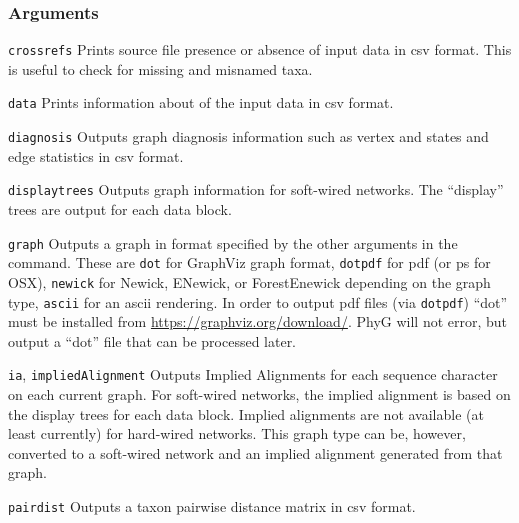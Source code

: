 \documentclass[11pt]{article}
\begin{document}
		\subsubsection{Arguments}
				\noindent \texttt{crossrefs} Prints source file presence or absence of input data in csv format.  This is useful to check for 
				missing and misnamed taxa.
			
				\smallskip
				\noindent \texttt{data} Prints information about of the input data in csv format.
				
				\smallskip
				\noindent \texttt{diagnosis}  Outputs graph diagnosis information such as vertex and states and edge statistics in csv format. 
			
				\smallskip
				\noindent \texttt{displaytrees}  Outputs graph information for soft-wired networks.  The ``display'' trees are output for each data block. 
				
				\smallskip
				\noindent \texttt{graph} Outputs a graph in format specified by the other arguments in the command.  These are \texttt{dot} for GraphViz graph format, \texttt{dotpdf} for pdf (or ps for OSX), 
				\texttt{newick} for Newick, ENewick, or ForestEnewick depending on the graph type, \texttt{ascii} for an ascii rendering.  In  order to output pdf files (via \texttt{dotpdf}) ``dot'' must be installed from \url{https://graphviz.org/download/}.  PhyG will not error, but output a ``dot'' file that can be processed later.
				
				\smallskip
				\noindent \texttt{ia}, \texttt{impliedAlignment} Outputs Implied Alignments for each sequence character on each current graph. For soft-wired networks, the implied alignment is based on the display trees for each data block.  Implied alignments are not available (at least currently) for hard-wired networks.  This graph type can be, however, converted to a soft-wired network and an implied alignment generated from that graph.  
				
				\smallskip
				\noindent \texttt{pairdist} Outputs a taxon pairwise distance matrix in csv format.  
				
\end{document}
